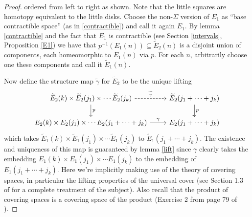 \documentclass[TFM.tex]{subfiles}
\begin{document}
\begin{proof}

ordered from left to right as shown. Note that the little squares are homotopy equivalent to the little disks. Choose the non-$\Sigma$ version of $E_1$ as ``base contractible space'' (as in \ref{contractible}) and call it again $E_1$. By lemma \ref{contractible} and the fact that $E_1$ is contractible (see Section \ref{intervals}, Proposition \ref{E1}) we have that $p^{-1}(E_1(n))\subseteq\widetilde{E}_2(n)$ is a disjoint union of components, each homeomorphic to $E_1(n)$ via $p$. For each $n$, arbitrarily choose one these components and call it $\widetilde{E}_1(n)$. 

Now define the structure map $\widetilde{\gamma}$ for $\widetilde{E}_2$ to be the unique lifting 
\[
\begin{tikzcd}
\widetilde{E}_2(k)\times\widetilde{E}_2(j_1)\times\cdots\widetilde{E}_2(j_k) \arrow[r, "\widetilde{\gamma}", dashed] \arrow[d, "p"] & \widetilde{E}_2(j_1+\cdots+j_k) \arrow[d, "p"] \arrow[d] \\
E_2(k)\times E_2(j_1)\times\cdots E_2(j_1+\cdots+j_k) \arrow[r, "\gamma"]                                                                      & E_2(j_1+\cdots+j_k)                                     
\end{tikzcd}
\]
which takes $\widetilde{E}_1(k)\times\widetilde{E}_1(j_1)\times\cdots\widetilde{E}_1(j_k)$ to $\widetilde{E}_1(j_1+\cdots+j_k)$. The existence and uniqueness of this map is guaranteed by lemma \ref{lift} since $\gamma$ clearly takes the embedding $E_1(k)\times E_1(j_1)\times\cdots E_1(j_k)$ to the embedding of $E_1(j_1+\cdots+j_k)$. Here we're implicitly making use of the theory of covering spaces, in particular the lifting properties of the universal cover (see Section 1.3 of \cite{HA} for a complete treatment of the subject). Also recall that the product of covering spaces is a covering space of the product (Exercise 2 from page 79 of \cite{HA}).


\end{proof}
\end{document}
